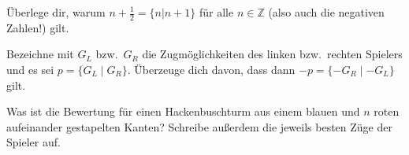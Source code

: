 \documentclass{zirkelbrief1516}
\newcommand{\ZZ}{\mathbb{Z}}
\begin{document}
\begin{aufgabe}\label{aufgabe:12}
Überlege dir, warum $n+\frac{1}{2}=\{n|n+1\}$ für alle $n\in\ZZ$ (also auch die negativen Zahlen!) gilt.
\end{aufgabe}

\begin{aufgabe}\label{aufgabe:minus}
Bezeichne mit $G_L$ bzw.\ $G_R$ die Zugmöglichkeiten des linken bzw.\ rechten Spielers und es sei $p=\{G_L\mid G_R\}$. Überzeuge dich davon, dass dann $-p=\{-G_R\mid -G_L\}$ gilt.
\end{aufgabe}

\begin{aufgabe}
  Was ist die Bewertung für einen Hackenbuschturm aus einem blauen und $n$ roten aufeinander gestapelten Kanten? Schreibe außerdem die jeweils besten Züge der Spieler auf.
\end{aufgabe}
\end{document}
